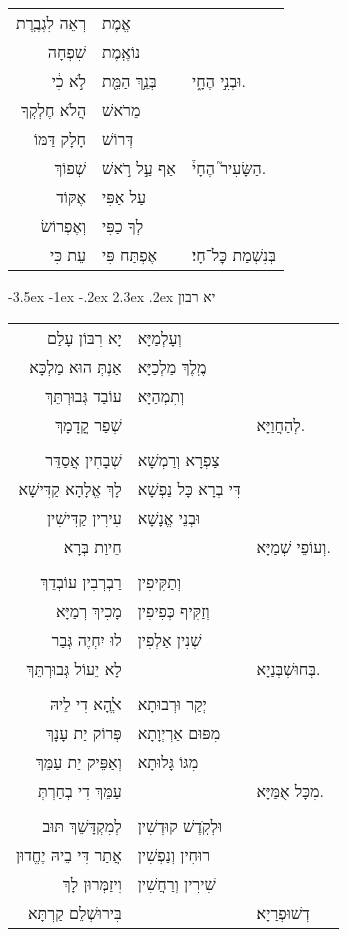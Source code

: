\documentclass[12pt,letterpaper]{siddur}
\makeatletter
\renewcommand\section{\setcounter{mishnah}{0}\@startsection {section}{1}{\z@}%
                                   {-3.5ex \@plus -1ex \@minus -.2ex}%
                                   {2.3ex \@plus.2ex}%
                                   {\normalfont\large}}
\makeatother
\begin{document}
\begin{longtable}[r]{r l l}
רְאֵה לִגְבֶֽרֶת & אֱמֶת\\
שִׁפְחָה & נוֹאֶֽמֶת\\
לֹ֣א כִ֔י & בְּנֵ֥ךְ הַמֵּ֖ת &
וּבְנִ֣י הֶחָ֑י.\\

הֲלֹא חֶלְקְךָ & מֵרֹאשׁ\\
חָלָק דַּמּוֹ & דְּרוֹשׁ\\
שְׁפוֹךְ & אַף עַ֣ל רֹ֣אשׁ &
הַשָּׂעִיר֮ הֶחָי֒.\\

אֶקּוֹד & עַל אַפִּי\\
וְאֶפְרוֹשׂ & לְךָ כַפִּי\\
עֵת כִּי & אֶפְתַּח פִּי &
בְּנִשְׁמַת כׇּל־חָי׃
\end{longtable}
\section{יא רבון}
\begin{longtable}[r]{r l l}
יָא רִבּוֹן עָלַם&וְעָלְמַיָּא\\
אַנְתְּ הוּא מַלְכָּא&מֶֽלֶךְ מַלְכַיָּא\\
עוֹבַד גְּבוּרְתֵּךְ&וְתִמְהַיָּא\\
שְׁפַר קֳדָמָךְ&&לְהַחֲוַיָּא.\\\\
שְׁבָחִין אֲסַדֵּר&צַפְרָא וְרַמְשָׁא\\
לָךְ אֱלָהָא קַדִּישָׁא&דִּי בְרָא כָּל נַפְשָׁא\\
עִירִין קַדִּישִׁין&וּבְנֵי אֱנָשָׁא\\
חֵיוַת בְּרָא&&וְעוֹפֵי שְׁמַיָּא.\\\\
רַבְרְבִין עוֹבְדֵךְ&וְתַקִּיפִין\\
מָכִיךְ רְמַיָּא&וְזַקִּיף כְּפִיפִין\\
לוּ יִחְיֶה גְּבַר&שְׁנִין אַלְפִין\\
לָא יֵעוֹל גְּבוּרְתֵּךְ&&בְּחוּשְׁבְּנַיָא.\\\\
ﭏֱהָא דִי לֵיהּ&יְקַר וּרְבוּתָא\\
פְּרוֹק יַת עָנָךְ&מִפּוּם אַרְיְוָתָא\\
וְאַפֵּיק יַת עַמֵּךְ&מִגּוֹ גָּלוּתָא\\
עַמֵּךְ דִי בְחַרְתְּ&&מִכָּל אֻמַּיָּא.\\\\
לְמִקְדָּשֵׁךְ תּוּב&וּלְקֺֽדֶשׁ קוּדְשִׁין\\
אֲתַר דִּי בֵיהּ יֶחֱדוּן&רוּחִין וְנַפְשִׁין\\
וִיזַמְּרוּן לָךְ&שִׁירִין וְרַחֲשִׁין\\
בִּירוּשְׁלֵם קַרְתָּא&&דְשׁוּפְרַיָא׃
\end{longtable}
\end{document}

